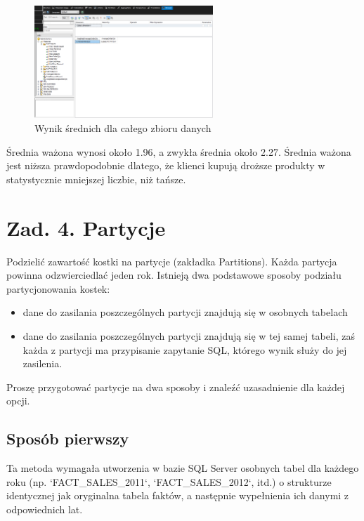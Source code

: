 \documentclass[a4paper,12pt]{article}
\begin{document}
\begin{figure}[H]
  \centering
  \includegraphics[width=0.6\textwidth]{3_result.png}
  \caption{Wynik średnich dla całego zbioru danych}
\end{figure}

Średnia ważona wynosi około 1.96, a zwykła średnia około 2.27. Średnia ważona jest niższa prawdopodobnie dlatego, że klienci kupują droższe produkty w statystycznie mniejszej liczbie, niż tańsze.

\section{Zad. 4. Partycje}

Podzielić zawartość kostki na partycje (zakładka Partitions). Każda partycja powinna
odzwierciedlać jeden rok. Istnieją dwa podstawowe sposoby podziału partycjonowania kostek:
\begin{itemize}
  \item dane do zasilania poszczególnych partycji znajdują się w osobnych tabelach
  \item dane do zasilania poszczególnych partycji znajdują się w tej samej tabeli, zaś każda z partycji ma przypisanie zapytanie SQL, którego wynik służy do jej zasilenia.
\end{itemize}
Proszę przygotować partycje na dwa sposoby i znaleźć uzasadnienie dla każdej opcji.

\subsection{Sposób pierwszy}

Ta metoda wymagała utworzenia w bazie SQL Server osobnych tabel dla każdego roku (np. `FACT\_SALES\_2011`, `FACT\_SALES\_2012`, itd.)
o strukturze identycznej jak oryginalna tabela faktów, a następnie wypełnienia ich danymi z odpowiednich lat.
\end{document}
